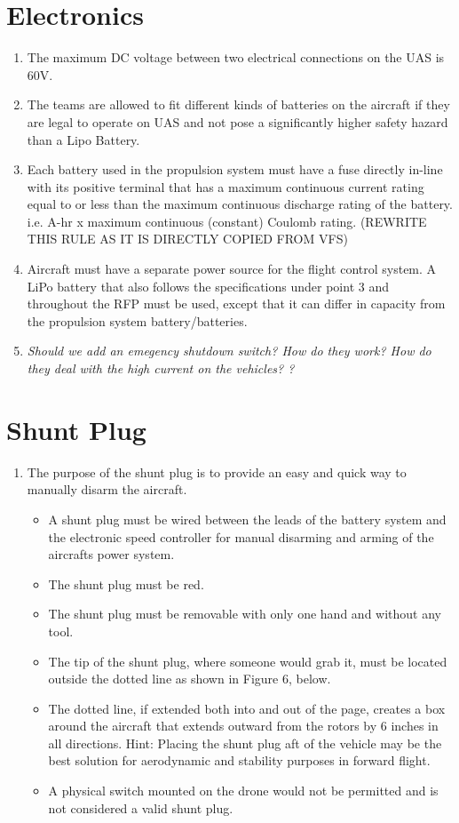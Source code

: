 \documentclass{article}
\begin{document}
\section{Electronics}
\begin{enumerate}
  \item The maximum DC voltage between two electrical connections on the UAS is 60V.
  \item The teams are allowed to fit different kinds of batteries on the aircraft if they are legal to operate on UAS and not pose a significantly higher safety hazard than a Lipo Battery. 
  \item Each battery used in the propulsion system must have a fuse directly in-line with its positive
  terminal that has a maximum continuous current rating equal to or less than the maximum continuous discharge rating of the battery. i.e. A-hr x maximum continuous (constant) Coulomb rating. (REWRITE THIS RULE AS IT IS DIRECTLY COPIED FROM VFS)
  \item Aircraft must have a separate power source for the flight control system. A LiPo battery that also follows the specifications under point 3 and throughout the RFP must be used, except that it can differ in capacity from the propulsion system battery/batteries.
  \item \emph{Should we add an emegency shutdown switch? How do they work? How do they deal with the high current on the vehicles? ?}
\end{enumerate}

\section{Shunt Plug}
\begin{enumerate}
  \item The purpose of the shunt plug is to provide an easy and quick way to manually disarm the
  aircraft.
  \begin{itemize}
    \item A shunt plug must be wired between the leads of the battery system and the electronic speed
    controller for manual disarming and arming of the aircrafts power system.
    \item The shunt plug must be red.
    \item The shunt plug must be removable with only one hand and without any tool.
    \item The tip of the shunt plug, where someone would grab it, must be located outside the dotted
    line as shown in Figure 6, below.
    \item The dotted line, if extended both into and out of the page, creates a box around the aircraft
    that extends outward from the rotors by 6 inches in all directions. Hint: Placing the shunt plug aft of the vehicle may be the best solution for aerodynamic and stability purposes in forward flight.
    \item A physical switch mounted on the drone would not be permitted and is not considered a valid shunt plug.
  \end{itemize}

\end{enumerate}
\end{document}
